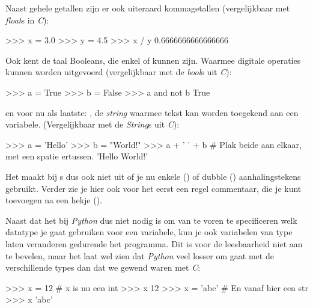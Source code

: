 Naast gehele getallen zijn er ook uiteraard kommagetallen (vergelijkbaar met \textit{float}s in \textit{C}):
\begin{python}
>>> x = 3.0
>>> y = 4.5
>>> x / y
0.6666666666666666
\end{python}

Ook kent de taal Booleans, die enkel  of  kunnen zijn. Waarmee digitale operaties kunnen worden uitgevoerd (vergelijkbaar met de \textit{bool}s uit \textit{C}):
\begin{python}
>>> a = True
>>> b = False
>>> a and not b
True
\end{python}

en voor nu als laatste: , de \textit{string} waarmee tekst kan worden toegekend aan een variabele. (Vergelijkbaar met de \textit{String}s uit \textit{C}):
\begin{python}
>>> a = 'Hello'
>>> b = "World!"
>>> a + ' ' + b  # Plak beide aan elkaar, met een spatie ertussen.
'Hello World!'
\end{python}
Het maakt bij s dus ook niet uit of je nu enkele () of dubble () aanhalingstekens gebruikt. Verder zie je hier ook voor het eerst een regel commentaar, die je kunt toevoegen na een hekje (\pyth{#}).


Naast dat het bij \textit{Python} dus niet nodig is om van te voren te specificeren welk datatype je gaat gebruiken voor een variabele, kun je ook variabelen van type laten veranderen gedurende het programma. Dit is voor de leesbaarheid niet aan te bevelen, maar het laat wel zien dat \textit{Python} veel losser om gaat met de verschillende types dan dat we gewend waren met \textit{C}:
\begin{python}
>>> x = 12  # x is nu een int
>>> x
12
>>> x = 'abc'  # En vanaf hier een str
>>> x
'abc'
\end{python}

